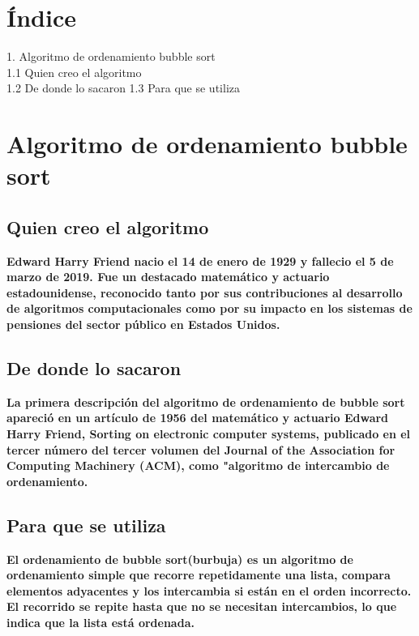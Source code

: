 \documentclass{article}
\begin{document}
\vspace{4cm}
\section*{Índice}
\Large
\Large
1. Algoritmo de ordenamiento bubble sort \\
1.1 Quien creo el algoritmo \\
1.2 De donde lo sacaron
1.3 Para que se utiliza


\newpage
\section{Algoritmo de ordenamiento bubble sort}
\vspace{2cm}
\subsection{Quien creo el algoritmo}
\normalsize
\textbf{ Edward Harry Friend nacio el 14 de enero de 1929 y fallecio el  5 de marzo de 2019. Fue un destacado matemático y actuario estadounidense, reconocido tanto por sus contribuciones al desarrollo de algoritmos computacionales como por su impacto en los sistemas de pensiones del sector público en Estados Unidos.}
\vspace{1cm}
\subsection{De donde lo sacaron}
\textbf{La primera descripción del algoritmo de ordenamiento de bubble sort apareció en un artículo de 1956 del matemático y actuario Edward Harry Friend, Sorting on electronic computer systems, publicado en el tercer número del tercer volumen del Journal of the Association for Computing Machinery (ACM), como "algoritmo de intercambio de ordenamiento.}

\vspace{1cm}
\subsection{Para que se utiliza}
\textbf{El ordenamiento de bubble sort(burbuja) es un algoritmo de ordenamiento simple que recorre repetidamente una lista, compara elementos adyacentes y los intercambia si están en el orden incorrecto. El recorrido se repite hasta que no se necesitan intercambios, lo que indica que la lista está ordenada.}
\end{document}
